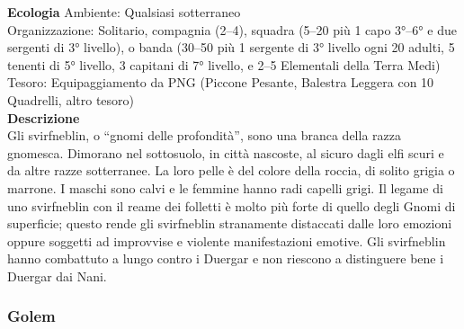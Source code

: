 \begin{multicols}{2}
\textbf{Ecologia}
Ambiente: Qualsiasi sotterraneo\\
Organizzazione: Solitario, compagnia (2–4), squadra (5–20 più 1 capo 3°–6° e due sergenti di 3° livello), o banda (30–50 più 1 sergente di 3° livello ogni 20 adulti, 5 tenenti di 5° livello, 3 capitani di 7° livello, e 2–5 Elementali della Terra Medi)\\
Tesoro: Equipaggiamento da PNG (Piccone Pesante, Balestra Leggera con 10 Quadrelli, altro tesoro)\\
\textbf{Descrizione}\\
Gli svirfneblin, o “gnomi delle profondità”, sono una branca della razza gnomesca. Dimorano nel sottosuolo, in città nascoste, al sicuro dagli elfi scuri e da altre razze sotterranee. La loro pelle è del colore della roccia, di solito grigia o marrone. I maschi sono calvi e le femmine hanno radi capelli grigi. Il legame di uno svirfneblin con il reame dei folletti è molto più forte di quello degli Gnomi di superficie; questo rende gli svirfneblin stranamente distaccati dalle loro emozioni oppure soggetti ad improvvise e violente manifestazioni emotive. Gli svirfneblin hanno combattuto a lungo contro i Duergar e non riescono a distinguere bene i Duergar dai Nani.\\

\subsubsection{Golem}


\end{multicols}
